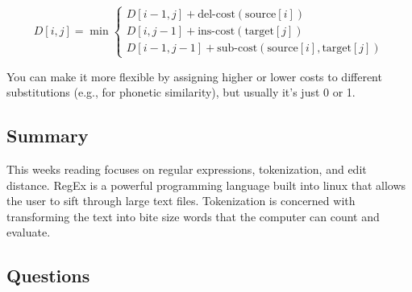 \documentclass{article}
\begin{document}
\[
    D[i, j] = \min \begin{cases}
        D[i - 1, j] + \text{del-cost}(\text{source}[i]) \\
        D[i, j - 1] + \text{ins-cost}(\text{target}[j]) \\
        D[i - 1, j - 1] + \text{sub-cost}(\text{source}[i], \text{target}[j])
    \end{cases}
\]


You can make it more flexible by assigning higher or lower costs to different substitutions (e.g., for phonetic similarity), but usually it's just 0 or 1.





\subsection{Summary}

This weeks reading focuses on regular expressions, tokenization, and edit distance. RegEx is a powerful programming language built into linux
that allows the user to sift through large text files. Tokenization is concerned with transforming the text into bite size words that the computer can count and evaluate.




\subsection{Questions}
\end{document}
